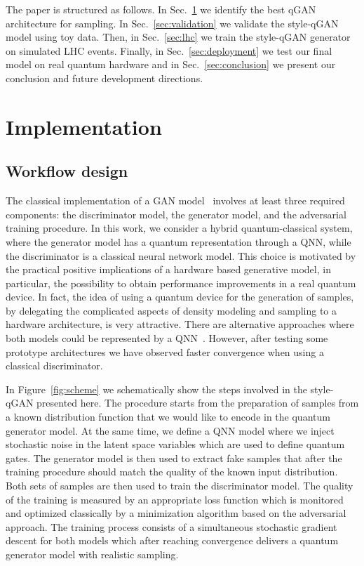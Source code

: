 \documentclass[twocolumn,preprintnumbers,superscriptaddress]{revtex4-2}
\begin{document}
The paper is structured as follows. In Sec.~\ref{sec:implementation} we identify
the best qGAN architecture for sampling. In Sec.~\ref{sec:validation} we
validate the style-qGAN model using toy data. Then, in Sec.~\ref{sec:lhc} we train the style-qGAN
generator on simulated LHC events. Finally, in Sec.~\ref{sec:deployment} we test
our final model on real quantum hardware and in Sec.~\ref{sec:conclusion} we
present our conclusion and future development directions.

\section{Implementation}
\label{sec:implementation}

\subsection{Workflow design}

The classical implementation of a GAN model~\cite{goodfellow2014generative}
involves at least three required components: the discriminator model, the
generator model, and the adversarial training procedure. In this work, we
consider a hybrid quantum-classical system, where the generator model has a
quantum representation through a QNN, while the
discriminator is a classical neural network model. This choice is motivated by
the practical positive implications of a hardware based generative model, in
particular, the possibility to obtain performance improvements in a real quantum
device. In fact, the idea of using a quantum device for the generation of
samples, by delegating the complicated aspects of density modeling and sampling
to a hardware architecture, is very attractive.
%
There are alternative approaches where both models could be represented by a
QNN~\cite{dallaire2018quantum, hu2019quantum, benedetti2019adversarial, romero2021variational, niu2021entangling}. However, after testing some prototype architectures we
have observed faster convergence when using a classical discriminator.

In Figure~\ref{fig:scheme} we schematically show the steps involved in the style-qGAN
presented here. The procedure starts from the preparation of samples from a
known distribution function that we would like to encode in the quantum
generator model. At the same time, we define a QNN model where
we inject stochastic noise in the latent space variables which are used to
define quantum gates. The generator model is then used to extract fake samples
that after the training procedure should match the quality of the known input
distribution. Both sets of samples are then used to train the discriminator
model. The quality of the training is measured by an appropriate loss function
which is monitored and optimized classically by a minimization algorithm based on
the adversarial approach. The training process consists of a simultaneous
stochastic gradient descent for both models which after reaching convergence
delivers a quantum generator model with realistic sampling.
\end{document}
